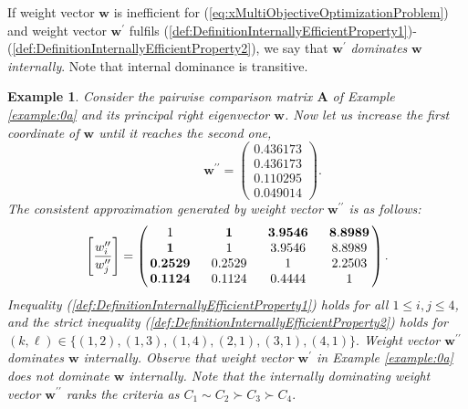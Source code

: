 \documentclass{article}
\theoremstyle{plain}
\newtheorem{example}{Example}[section]
\begin{document}
If weight vector $\mathbf{w}$ is inef{\kern0pt}f{\kern0pt}icient for  (\ref{eq:xMultiObjectiveOptimizationProblem}) and
weight vector $\mathbf{w^{\prime}}$ fulf{\kern0pt}ils (\ref{def:DefinitionInternallyEfficientProperty1})-(\ref{def:DefinitionInternallyEfficientProperty2}),
we say that $\mathbf{w^{\prime}}$ \emph{dominates} $\mathbf{w}$ \emph{internally}.
Note that internal dominance is transitive.

\begin{example}  \label{example:0b}
Consider the pairwise comparison matrix $\mathbf{A}$ of Example \ref{example:0a}
and its principal right eigenvector $\mathbf{w}$.
Now let us increase the f{\kern0pt}irst coordinate of $\mathbf{w}$ until it reaches the second one,
\[
\qquad \qquad {\mathbf{w}^{\prime\prime}} =
\begin{pmatrix}
\mathbf{0.436173}  \\
0.436173 \\
0.110295  \\
0.049014
\end{pmatrix}.
\]
The consistent approximation generated by weight vector ${\mathbf{w}}^{\prime\prime}$ is as follows:
\[
\left[ \frac{{w}^{\prime\prime}_i}{{w}^{\prime\prime}_j} \right] =
\begin{pmatrix}
$\,$   1    $\,\,$ & $\,\,$   \mathbf{1}    $\,\,$ & $\,\,$ \mathbf{3.9546} $\,\,$ & $\,\,$ \mathbf{8.8989} $\,$    \\
$\,$ \mathbf{1}    $\,\,$ & $\,\,$   1    $\,\,$ & $\,\,$ 3.9546 $\,\,$ & $\,\,$ 8.8989 $\,$    \\
$\,$ \mathbf{0.2529} $\,\,$ & $\,\,$ 0.2529 $\,\,$ & $\,\,$   1    $\,\,$ & $\,\,$ 2.2503 $\,$   \\
$\,$ \mathbf{0.1124} $\,\,$ & $\,\,$ 0.1124 $\,\,$ & $\,\,$ 0.4444 $\,\,$ & $\,\,$   1    $\,$
\end{pmatrix}.
\]
Inequality (\ref{def:DefinitionInternallyEfficientProperty1})
holds for all $1 \leq i,j \leq 4$, and the strict inequality
(\ref{def:DefinitionInternallyEfficientProperty2}) holds for
\linebreak $(k,\ell) \in \{(1,2), (1,3), (1,4), (2,1), (3,1),
(4,1)  \}.$ Weight vector ${\mathbf{w}}^{\prime\prime}$  dominates
${\mathbf{w}}$ internally. Observe that weight vector
${\mathbf{w}}^{\prime}$ in Example \ref{example:0a} does not dominate
${\mathbf{w}}$ internally. Note that the internally dominating
weight vector $\mathbf{w}^{\prime\prime}$
ranks the criteria as  $C_1 \sim C_2 \succ C_3 \succ C_4.$ \\


\end{example}
\end{document}

